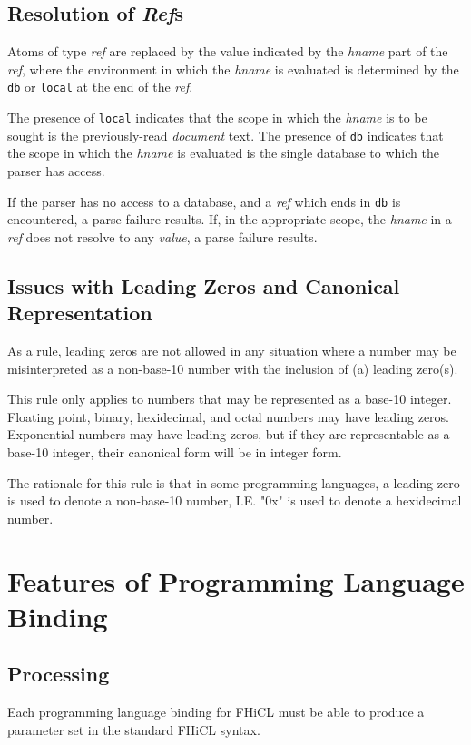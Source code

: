 \documentclass{memarticle}
\begin{document}
	\subsection{Resolution of \emph{Ref}s\label{sec:refs}}
		Atoms of type \emph{ref} are replaced
		by the value indicated by the \emph{hname} part of the \emph{ref},
		where the environment in which the \emph{hname} is evaluated is determined
		by the \texttt{db} or \texttt{local} at the end of the \emph{ref}.
		\vspace{1mm}
		\par
		The presence of \texttt{local} indicates 
		that the scope in which the \emph{hname} is to be sought
		is the previously-read \emph{document} text.
		The presence of 
		\texttt{db} indicates
		that the scope in which the \emph{hname} is evaluated
		is the single database
		to which the parser has access.
		\vspace{1mm}
		\par
		If the parser has no access to a database,
		and a \emph{ref} which ends in \texttt{db} is encountered,
		a parse failure results.
		If,
		in the appropriate scope,
		the \emph{hname} in a \emph{ref} does not resolve to any \emph{value},
		a parse failure results.
	\subsection{Issues with Leading Zeros and Canonical Representation}
		As a rule, leading zeros are not allowed
		in any situation where a number may be misinterpreted as a non-base-10 number
		with the inclusion of (a) leading zero(s).
		\par
		This rule only applies to numbers that may be represented as a base-10 integer.
		Floating point, binary, hexidecimal, and octal numbers may have leading zeros.
		Exponential numbers may have leading zeros, but if they are representable as a base-10 integer,
		their canonical form will be in integer form.
		\par
		The rationale for this rule is that in some programming languages,
		a leading zero is used to denote a non-base-10 number,
		I.E. "0x" is used to denote a hexidecimal number.	
\section{Features of Programming Language Binding}
	\subsection{Processing}
		Each programming language binding for FHiCL must be able to produce a parameter set
		in the standard FHiCL syntax. 
	
\end{document}
